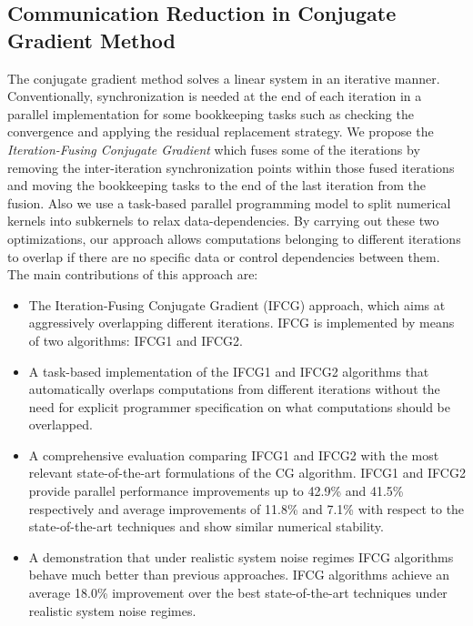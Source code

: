 \subsection{Communication Reduction in Conjugate Gradient Method}
The conjugate gradient method solves a linear system in an iterative manner.  
Conventionally, synchronization is needed at the end of each iteration in a 
parallel implementation for some bookkeeping tasks such as checking the 
convergence and applying the residual replacement strategy.  We propose the 
\emph{Iteration-Fusing Conjugate Gradient} which fuses some of the iterations by 
removing the inter-iteration synchronization points within those fused 
iterations and moving the bookkeeping tasks to the end of the last iteration 
from the fusion.  Also we use a task-based parallel programming model to split 
numerical kernels into subkernels to relax data-dependencies. By carrying out 
these two optimizations, our approach allows computations belonging to different 
iterations to overlap if there are no specific data or control dependencies 
between them.
The main contributions of this approach are:
\begin{itemize}
       \item The Iteration-Fusing Conjugate Gradient (IFCG) approach, which aims 
           at aggressively overlapping different iterations. IFCG is implemented 
           by means of two algorithms: IFCG1 and IFCG2.
       \item A task-based implementation of the IFCG1 and IFCG2 algorithms that 
           automatically overlaps computations from different iterations without 
           the need for explicit programmer specification on what computations 
           should be overlapped.
       \item A comprehensive evaluation comparing IFCG1 and IFCG2 with the most 
           relevant state-of-the-art formulations of the CG algorithm.  IFCG1 
           and IFCG2 provide parallel performance improvements up to 42.9\% and 
           41.5\% respectively and average improvements of 11.8\% and 7.1\% with 
           respect to the state-of-the-art techniques and show similar numerical 
           stability.
        \item A demonstration that under realistic system noise regimes IFCG 
            algorithms behave much better than previous approaches. IFCG 
            algorithms achieve an average 18.0\% improvement over the best 
            state-of-the-art techniques under realistic system noise regimes.
\end{itemize}

